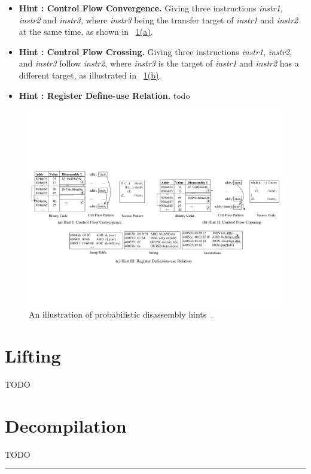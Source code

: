 \begin{itemize}

  \item \textbf{Hint : Control Flow Convergence.} Giving three instructions \textit{instr1}, \textit{instr2} and \textit{instr3}, where \textit{instr3} being the transfer target of \textit{instr1} and \textit{instr2} at the same time, as shown in \F~\hyperref[fig:hints]{1(a)}.
  \item \textbf{Hint : Control Flow Crossing.} Giving three instructions \textit{instr1}, \textit{instr2}, and \textit{instr3} follow \textit{instr2}, where \textit{instr3} is the target of \textit{instr1} and \textit{instr2} has a different target, as illustrated in \F~\hyperref[fig:hints]{1(b)}.
  \item \textbf{Hint : Register Define-use Relation.} todo

\end{itemize}

\begin{figure}[tb]
  \centering
  \includegraphics[width=1.0\textwidth]{fig/hints.pdf}
  \caption{An illustration of probabilistic disassembly hints~\cite{miller2019probabilistic}.}
  \label{fig:hints}
\end{figure}

\section{Lifting} \label{sec:existing-lifting}
TODO

\section{Decompilation} \label{sec:existing-decompilation}
TODO


\noindent\rule{8cm}{0.4pt}

\newpage
